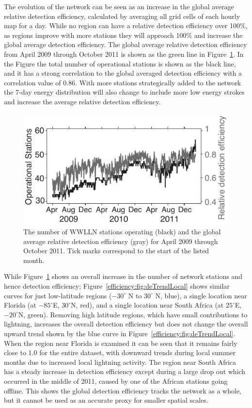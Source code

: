 The evolution of the network can be seen as an increase in the global average relative detection efficiency, calculated by averaging all grid cells of each hourly map for a day.
While no region can have a relative detection efficiency over 100\%, as regions improve with more stations they will approach 100\% and increase the global average detection efficiency.
The global average relative detection efficiency from April 2009 through October 2011 is shown as the green line in Figure~\ref{efficiency:fig:DE_Evolution}.
In the Figure the total number of operational stations is shown as the black line, and it has a strong correlation to the global averaged detection efficiency with a correlation value of 0.86.
With more stations strategically added to the network the 7-day energy distribution will also change to include more low energy strokes and increase the average relative detection efficiency.


\begin{figure}[ht!]
   \centering
\noindent\includegraphics[scale=1]{efficiency/Figures/2012RS005049-p9.pdf}
   \caption{The number of WWLLN stations operating (black) and the global average relative detection efficiency (gray) for April 2009 through October 2011.
   Tick marks correspond to the start of the listed month.}
   \label{efficiency:fig:DE_Evolution}
\end{figure}

While Figure~\ref{efficiency:fig:DE_Evolution} shows an overall increase in the number of network stations and hence detection efficiency; Figure~\ref{efficiency:fig:deTrendLocal} shows similar curves for just low-latitude regions ($-30^\circ$ N to $30^\circ$ N, blue), a single location near Florida (at $-85^\circ$E, $30^\circ$N, red), and a single location near South Africa (at $25^\circ$E, $-20^\circ$N, green).
Removing high latitude regions, which have small contributions to lightning, increases the overall detection efficiency but does not change the overall upward trend shown by the blue curve in Figure~\ref{efficiency:fig:deTrendLocal}.
When the region near Florida is examined it can be seen that it remains fairly close to 1.0 for the entire dataset, with downward trends during local summer months due to increased local lightning activity.
The region near South Africa has a steady increase in detection efficiency except during a large drop out which occurred in the middle of 2011, caused by one of the African stations going offline.
This shows the global detection efficiency tracks the network as a whole, but it cannot be used as an accurate proxy for smaller spatial scales.

